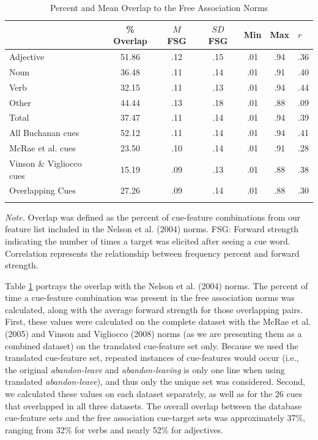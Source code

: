 \documentclass[english,,man]{apa6}
\begin{document}
\begin{table}[tbp]
\begin{center}
\begin{threeparttable}
\caption{\label{tab:divergent-table}Percent and Mean Overlap to the Free Association Norms}
\begin{tabular}{lcccccl}
\toprule
  & \% Overlap & $M$ FSG & $SD$ FSG & Min & Max & $r$\\
\midrule
Adjective & 51.86 & .12 & .15 & .01 & .94 & .36\\
Noun & 36.48 & .11 & .14 & .01 & .91 & .40\\
Verb & 32.15 & .11 & .13 & .01 & .94 & .44\\
Other & 44.44 & .13 & .18 & .01 & .88 & .09\\
Total & 37.47 & .11 & .14 & .01 & .94 & .39\\
All Buchanan cues & 52.12 & .11 & .14 & .01 & .94 & .41\\
McRae et al. cues & 23.50 & .10 & .14 & .01 & .91 & .28\\
Vinson \& Vigliocco cues & 15.19 & .09 & .13 & .01 & .88 & .38\\
Overlapping Cues & 27.26 & .09 & .14 & .01 & .88 & .30\\
\bottomrule
\addlinespace
\end{tabular}
\begin{tablenotes}[para]
\normalsize{\textit{Note.} Overlap was defined as the percent of cue-feature combinations from our feature list included in the Nelson et al. (2004) norms. FSG: Forward strength indicating the number of times a target was elicited after seeing a cue word. Correlation represents the relationship between frequency percent and forward strength.}
\end{tablenotes}
\end{threeparttable}
\end{center}
\end{table}

Table \ref{tab:divergent-table} portrays the overlap with the Nelson et al. (2004) norms. The percent of time a cue-feature combination was present in the free association norms was calculated, along with the average forward strength for those overlapping pairs. First, these values were calculated on the complete dataset with the McRae et al. (2005) and Vinson and Vigliocco (2008) norms (as we are presenting them as a combined dataset) on the translated cue-feature set only. Because we used the translated cue-feature set, repeated instances of cue-features would occur (i.e., the original \emph{abandon-leave} and \emph{abandon-leaving} is only one line when using translated \emph{abandon-leave}), and thus only the unique set was considered. Second, we calculated these values on each dataset separately, as well as for the 26 cues that overlapped in all three datasets. The overall overlap between the database cue-feature sets and the free association cue-target sets was approximately 37\%, ranging from 32\% for verbs and nearly 52\% for adjectives.
\end{document}
